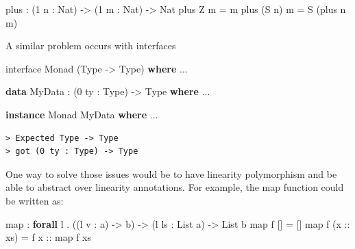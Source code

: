 \documentclass[
]{article}
\newenvironment{Shaded}{}{}
\newcommand{\DataTypeTok}[1]{\textcolor[rgb]{0.56,0.13,0.00}{#1}}
\newcommand{\DecValTok}[1]{\textcolor[rgb]{0.25,0.63,0.44}{#1}}
\newcommand{\FunctionTok}[1]{\textcolor[rgb]{0.02,0.16,0.49}{#1}}
\newcommand{\KeywordTok}[1]{\textcolor[rgb]{0.00,0.44,0.13}{\textbf{#1}}}
\newcommand{\NormalTok}[1]{#1}
\newcommand{\OperatorTok}[1]{\textcolor[rgb]{0.40,0.40,0.40}{#1}}
\newcommand{\OtherTok}[1]{\textcolor[rgb]{0.00,0.44,0.13}{#1}}
\begin{document}
\begin{Shaded}
\begin{Highlighting}[]
\NormalTok{plus }\OperatorTok{:}\NormalTok{ (}\DecValTok{1}\NormalTok{ n }\OperatorTok{:} \DataTypeTok{Nat}\NormalTok{) }\OtherTok{{-}\textgreater{}}\NormalTok{ (}\DecValTok{1}\NormalTok{ m }\OperatorTok{:} \DataTypeTok{Nat}\NormalTok{) }\OtherTok{{-}\textgreater{}} \DataTypeTok{Nat}
\NormalTok{plus }\DataTypeTok{Z}\NormalTok{ m }\OtherTok{=}\NormalTok{ m}
\NormalTok{plus (}\DataTypeTok{S}\NormalTok{ n) m }\OtherTok{=} \DataTypeTok{S}\NormalTok{ (plus n m)}
\end{Highlighting}
\end{Shaded}

A similar problem occurs with interfaces

\begin{Shaded}
\begin{Highlighting}[]
\NormalTok{interface }\DataTypeTok{Monad}\NormalTok{ (}\DataTypeTok{Type} \OtherTok{{-}\textgreater{}} \DataTypeTok{Type}\NormalTok{) }\KeywordTok{where}
    \OperatorTok{...}

\KeywordTok{data} \DataTypeTok{MyData} \OperatorTok{:}\NormalTok{ (}\DecValTok{0}\NormalTok{ ty }\OperatorTok{:} \DataTypeTok{Type}\NormalTok{) }\OtherTok{{-}\textgreater{}} \DataTypeTok{Type} \KeywordTok{where}
    \OperatorTok{...}

\KeywordTok{instance} \DataTypeTok{Monad} \DataTypeTok{MyData} \KeywordTok{where}
    \OperatorTok{...}
\end{Highlighting}
\end{Shaded}

\begin{verbatim}
> Expected Type -> Type
> got (0 ty : Type) -> Type
\end{verbatim}

One way to solve those issues would be to have linearity polymorphism
and be able to abstract over linearity annotations. For example, the map
function could be written as:

\begin{Shaded}
\begin{Highlighting}[]
\FunctionTok{map} \OperatorTok{:} \KeywordTok{forall}\NormalTok{ l }\OperatorTok{.}\NormalTok{ ((l v }\OperatorTok{:}\NormalTok{ a) }\OtherTok{{-}\textgreater{}}\NormalTok{ b) }\OtherTok{{-}\textgreater{}}\NormalTok{ (l ls }\OperatorTok{:} \DataTypeTok{List}\NormalTok{ a) }\OtherTok{{-}\textgreater{}} \DataTypeTok{List}\NormalTok{ b}
\FunctionTok{map}\NormalTok{ f [] }\OtherTok{=}\NormalTok{ []}
\FunctionTok{map}\NormalTok{ f (}\OtherTok{x ::}\NormalTok{ xs) }\OtherTok{=}\NormalTok{ f}\OtherTok{ x ::} \FunctionTok{map}\NormalTok{ f xs}
\end{Highlighting}
\end{Shaded}
\end{document}
